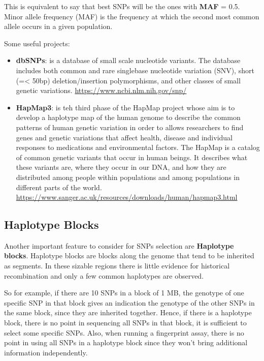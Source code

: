 This is equivalent to say that best SNPs will be the ones with \textbf{MAF} = 0.5. Minor allele frequency (MAF) is the frequency at which the second most common allele occurs in a given population.

\bigskip
Some useful projects:
\begin{itemize}
	\item \textbf{dbSNPs}: is a database of small scale nucleotide variants. The database includes both common and rare singlebase nucleotide variation (SNV), short (=< 50bp) deletion/insertion polymorphisms, and other classes of small genetic variations.
	\url{https://www.ncbi.nlm.nih.gov/snp/}
	
	\item \textbf{HapMap3}: is teh third phase of the HapMap project whose aim is to develop a haplotype map of the human genome to describe the common patterns of human genetic variation in order to allows researchers to find genes and genetic variations that affect health, disease and individual responses to medications and environmental factors. The HapMap is a catalog of common genetic variants that occur in human beings. It describes what these variants are, where they occur in our DNA, and how they are distributed among people within populations and among populations in different parts of the world.
	\url{https://www.sanger.ac.uk/resources/downloads/human/hapmap3.html}
\end{itemize}

\subsection*{Haplotype Blocks}

Another important feature to consider for SNPs selection are \textbf{Haplotype blocks}. Haplotype blocks are blocks along the genome that tend to be inherited as segments. In these sizable regions there is little evidence for historical recombination and only a few common haplotypes are observed. 

So for example, if there are 10 SNPs in a block of 1 MB, the genotype of one specific SNP in that block gives an indication the genotype of the other SNPs in the same block, since they are inherited together. 
Hence, if there is a haplotype block, there is no point in sequencing all SNPs in that block, it is sufficient to select some specific SNPs. Also, when running a fingerprint assay, there is no point in using all SNPs in a haplotype block since they won't bring additional information independently.

